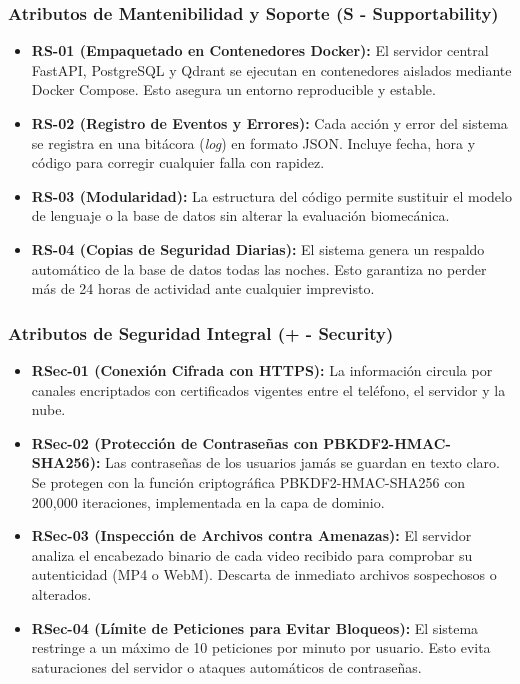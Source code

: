\documentclass[12pt,letterpaper]{article}
\begin{document}
\subsubsection{Atributos de Mantenibilidad y Soporte (S - Supportability)}
\begin{itemize}
    \item \textbf{RS-01 (Empaquetado en Contenedores Docker):} El servidor central FastAPI, PostgreSQL y Qdrant se ejecutan en contenedores aislados mediante Docker Compose. Esto asegura un entorno reproducible y estable.
    \item \textbf{RS-02 (Registro de Eventos y Errores):} Cada acción y error del sistema se registra en una bitácora (\textit{log}) en formato JSON. Incluye fecha, hora y código para corregir cualquier falla con rapidez.
    \item \textbf{RS-03 (Modularidad):} La estructura del código permite sustituir el modelo de lenguaje o la base de datos sin alterar la evaluación biomecánica.
    \item \textbf{RS-04 (Copias de Seguridad Diarias):} El sistema genera un respaldo automático de la base de datos todas las noches. Esto garantiza no perder más de 24 horas de actividad ante cualquier imprevisto.
\end{itemize}

\subsubsection{Atributos de Seguridad Integral (+ - Security)}
\begin{itemize}
    \item \textbf{RSec-01 (Conexión Cifrada con HTTPS):} La información circula por canales encriptados con certificados vigentes entre el teléfono, el servidor y la nube.
    \item \textbf{RSec-02 (Protección de Contraseñas con PBKDF2-HMAC-SHA256):} Las contraseñas de los usuarios jamás se guardan en texto claro. Se protegen con la función criptográfica PBKDF2-HMAC-SHA256 con 200,000 iteraciones, implementada en la capa de dominio.
    \item \textbf{RSec-03 (Inspección de Archivos contra Amenazas):} El servidor analiza el encabezado binario de cada video recibido para comprobar su autenticidad (MP4 o WebM). Descarta de inmediato archivos sospechosos o alterados.
    \item \textbf{RSec-04 (Límite de Peticiones para Evitar Bloqueos):} El sistema restringe a un máximo de 10 peticiones por minuto por usuario. Esto evita saturaciones del servidor o ataques automáticos de contraseñas.
\end{itemize}
\end{document}
